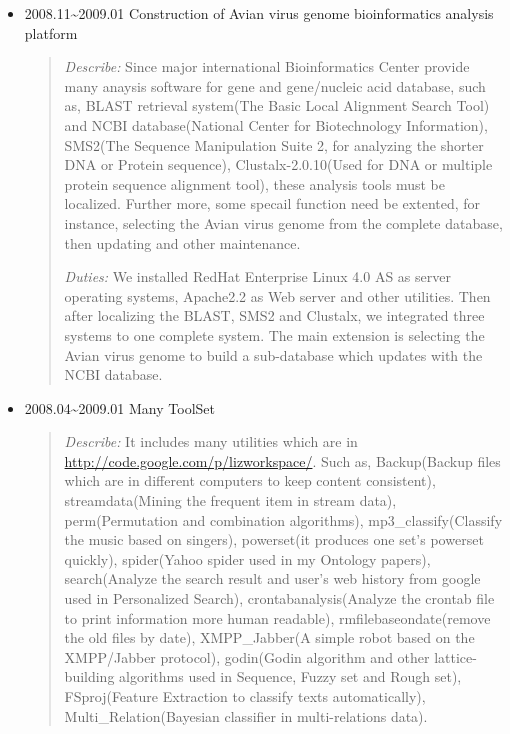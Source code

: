 \documentclass[a4paper,10pt,english]{manual}
\begin{document}
\begin{itemize}
\item {} 
2008.11\textasciitilde{}2009.01 Construction of Avian virus genome bioinformatics analysis platform
\begin{quote}

\emph{Describe:} Since major international Bioinformatics Center provide many anaysis software for gene and gene/nucleic acid database, such as, BLAST retrieval system(The Basic Local Alignment Search Tool) and NCBI database(National Center for Biotechnology Information), SMS2(The Sequence Manipulation Suite 2, for analyzing the shorter DNA or Protein sequence), Clustalx-2.0.10(Used for DNA or multiple protein sequence alignment tool), these analysis tools must be localized. Further more, some specail function need be extented, for instance, selecting the Avian virus genome from the complete database, then updating and other maintenance.

\emph{Duties:} We installed RedHat Enterprise Linux 4.0 AS as server operating systems, Apache2.2 as Web server and other utilities. Then after localizing the BLAST, SMS2 and Clustalx, we integrated three systems to one complete system. The main extension is selecting the Avian virus genome to build a sub-database which updates with the NCBI database.
\end{quote}

\item {} 
2008.04\textasciitilde{}2009.01 Many ToolSet
\begin{quote}

\emph{Describe:} It includes many utilities which are in \href{http://code.google.com/p/lizworkspace/}{http://code.google.com/p/lizworkspace/}. Such as, Backup(Backup files which are in different computers to keep content consistent), streamdata(Mining the frequent item in stream data), perm(Permutation and combination algorithms), mp3\_classify(Classify the music based on singers), powerset(it produces one set's powerset quickly), spider(Yahoo spider used in my Ontology papers), search(Analyze the search result and user's web history from google used in Personalized Search), crontabanalysis(Analyze the crontab file to print information more human readable), rmfilebaseondate(remove the old files by date), XMPP\_Jabber(A simple robot  based on the XMPP/Jabber protocol), godin(Godin algorithm and other lattice-building algorithms used in Sequence, Fuzzy set and Rough set), FSproj(Feature Extraction to classify texts automatically), Multi\_Relation(Bayesian classifier in multi-relations data).
\end{quote}

\end{itemize}
\end{document}
